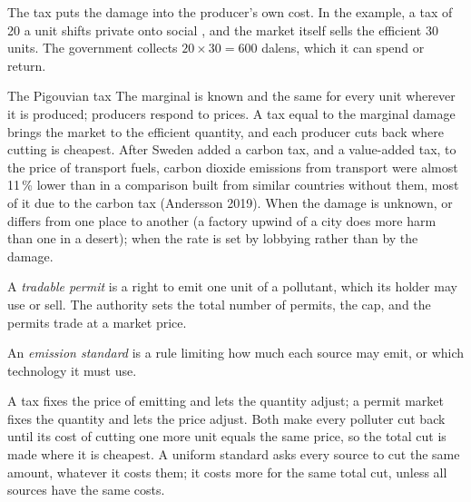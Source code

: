 The tax puts the damage into the producer's own cost. In the example, a tax of 20 a unit shifts private  onto social , and the market
itself sells the efficient 30 units. The government collects $20 \times 30 = 600$ dalens, which it can spend or return.

\begin{model}{The Pigouvian tax}
\assumes The marginal  is known and the same for every unit wherever it is produced; producers respond to prices.
\predicts A tax equal to the marginal damage brings the market to the efficient quantity, and each producer cuts back where cutting is cheapest.
\tested After Sweden added a carbon tax, and a value-added tax, to the price of transport fuels, carbon dioxide emissions from transport were almost
  11\,\% lower than in a comparison built from similar countries without them, most of it due to the carbon tax (Andersson 2019).
\breaks When the damage is unknown, or differs from one place to another (a factory upwind of a city does more harm than one in a desert); when the rate is set by
  lobbying rather than by the damage.
\end{model}

\begin{definition}\label{def:g11:externalities:tradable-permit}
A \emph{tradable permit} is a right to emit one unit of a pollutant, which its holder may use or sell. The authority sets the total number of
permits, the cap, and the permits trade at a market price.
\end{definition}

\begin{definition}\label{def:g11:externalities:standard}
An \emph{emission standard} is a rule limiting how much each source may emit, or which technology it must use.
\end{definition}

A tax fixes the price of emitting and lets the quantity adjust; a permit market fixes the quantity and lets the price adjust. Both make every polluter cut back until
its cost of cutting one more unit equals the same price, so the total cut is made where it is cheapest. A uniform standard asks every source to cut the same amount,
whatever it costs them; it costs more for the same total cut, unless all sources have the same costs.

